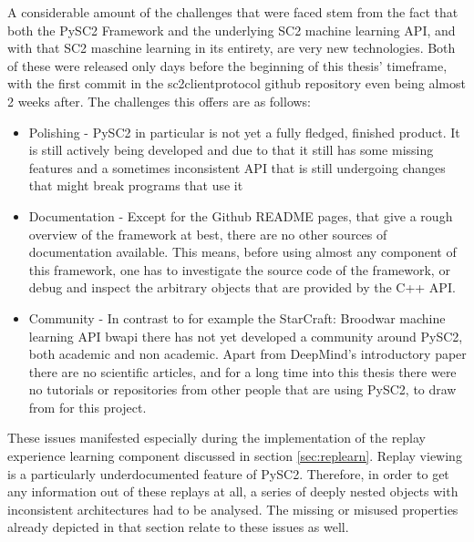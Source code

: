 A considerable amount of the challenges that were faced stem from the fact that both the PySC2 Framework and the underlying SC2 machine learning API, and with that SC2 maschine learning in its entirety, are very new technologies. Both of these were released only days before the beginning of this thesis' timeframe, with the first commit in the sc2clientprotocol github repository even being almost 2 weeks after. The challenges this offers are as follows:
\begin{itemize}
\item Polishing - PySC2 in particular is not yet a fully fledged, finished product. It is still actively being developed and due to that it still has some missing features and a sometimes inconsistent API that is still undergoing changes that might break programs that use it
\item Documentation - Except for the Github README pages, that give a rough overview of the framework at best, there are no other sources of documentation available. This means, before using almost any component of this framework, one has to investigate the source code of the framework, or debug and inspect the arbitrary objects that are provided by the C++ API.
\newpage
\item Community - In contrast to for example the StarCraft: Broodwar machine learning API bwapi there has not yet developed a community around PySC2, both academic and non academic. Apart from DeepMind's introductory paper there are no scientific articles, and for a long time into this thesis there were no tutorials or repositories from other people that are using PySC2, to draw from for this project.  
\end{itemize}

These issues manifested especially during the implementation of the replay experience learning component discussed in section \ref{sec:replearn}. Replay viewing is a particularly underdocumented feature of PySC2. Therefore, in order to get any information out of these replays at all, a series of deeply nested objects with inconsistent architectures had to be analysed. The missing or misused properties already depicted in that section relate to these issues as well.

